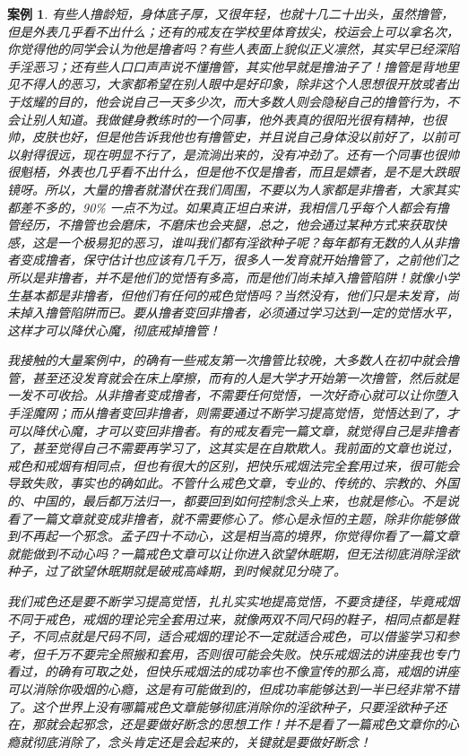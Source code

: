 \documentclass{ctexart}
\newtheorem{case}{案例}
\begin{document}
\begin{case}
    有些人撸龄短，身体底子厚，又很年轻，也就十几二十出头，虽然撸管，但是外表几乎看不出什么；还有的戒友在学校里体育拔尖，校运会上可以拿名次，你觉得他的同学会认为他是撸者吗？有些人表面上貌似正义凛然，其实早已经深陷手淫恶习；还有些人口口声声说不懂撸管，其实他早就是撸油子了！撸管是背地里见不得人的恶习，大家都希望在别人眼中是好印象，除非这个人思想很开放或者出于炫耀的目的，他会说自己一天多少次，而大多数人则会隐秘自己的撸管行为，不会让别人知道。我做健身教练时的一个同事，他外表真的很阳光很有精神，也很帅，皮肤也好，但是他告诉我他也有撸管史，并且说自己身体没以前好了，以前可以射得很远，现在明显不行了，是流淌出来的，没有冲劲了。还有一个同事也很帅很魁梧，外表也几乎看不出什么，但是他不仅是撸者，而且是嫖者，是不是大跌眼镜呀。所以，大量的撸者就潜伏在我们周围，不要以为人家都是非撸者，大家其实都差不多的，90\% 一点不为过。如果真正坦白来讲，我相信几乎每个人都会有撸管经历，不撸管也会磨床，不磨床也会夹腿，总之，他会通过某种方式来获取快感，这是一个极易犯的恶习，谁叫我们都有淫欲种子呢？每年都有无数的人从非撸者变成撸者，保守估计也应该有几千万，很多人一发育就开始撸管了，之前他们之所以是非撸者，并不是他们的觉悟有多高，而是他们尚未掉入撸管陷阱！就像小学生基本都是非撸者，但他们有任何的戒色觉悟吗？当然没有，他们只是未发育，尚未掉入撸管陷阱而已。要从撸者变回非撸者，必须通过学习达到一定的觉悟水平，这样才可以降伏心魔，彻底戒掉撸管！

    我接触的大量案例中，的确有一些戒友第一次撸管比较晚，大多数人在初中就会撸管，甚至还没发育就会在床上摩擦，而有的人是大学才开始第一次撸管，然后就是一发不可收拾。从非撸者变成撸者，不需要任何觉悟，一次好奇心就可以让你堕入手淫魔网；而从撸者变回非撸者，则需要通过不断学习提高觉悟，觉悟达到了，才可以降伏心魔，才可以变回非撸者。有的戒友看完一篇文章，就觉得自己是非撸者了，甚至觉得自己不需要再学习了，这其实是在自欺欺人。我前面的文章也说过，戒色和戒烟有相同点，但也有很大的区别，把快乐戒烟法完全套用过来，很可能会导致失败，事实也的确如此。不管什么戒色文章，专业的、传统的、宗教的、外国的、中国的，最后都万法归一，都要回到如何控制念头上来，也就是修心。不是说看了一篇文章就变成非撸者，就不需要修心了。修心是永恒的主题，除非你能够做到不再起一个邪念。孟子四十不动心，这是相当高的境界，你觉得你看了一篇文章就能做到不动心吗？一篇戒色文章可以让你进入欲望休眠期，但无法彻底消除淫欲种子，过了欲望休眠期就是破戒高峰期，到时候就见分晓了。

    我们戒色还是要不断学习提高觉悟，扎扎实实地提高觉悟，不要贪捷径，毕竟戒烟不同于戒色，戒烟的理论完全套用过来，就像两双不同尺码的鞋子，相同点都是鞋子，不同点就是尺码不同，适合戒烟的理论不一定就适合戒色，可以借鉴学习和参考，但千万不要完全照搬和套用，否则很可能会失败。快乐戒烟法的讲座我也专门看过，的确有可取之处，但快乐戒烟法的成功率也不像宣传的那么高，戒烟的讲座可以消除你吸烟的心瘾，这是有可能做到的，但成功率能够达到一半已经非常不错了。这个世界上没有哪篇戒色文章能够彻底消除你的淫欲种子，只要淫欲种子还在，那就会起邪念，还是要做好断念的思想工作！并不是看了一篇戒色文章你的心瘾就彻底消除了，念头肯定还是会起来的，关键就是要做好断念！


\end{case}
\end{document}
